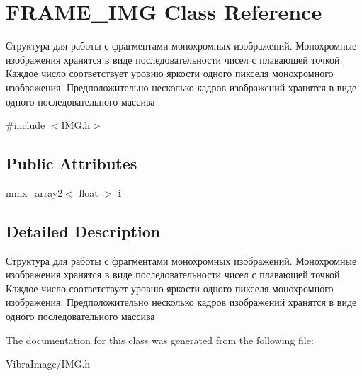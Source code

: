 \hypertarget{class_f_r_a_m_e___i_m_g}{\section{F\+R\+A\+M\+E\+\_\+\+I\+M\+G Class Reference}
\label{class_f_r_a_m_e___i_m_g}
}


Структура для работы с фрагментами монохромных изображений. Монохромные изображения хранятся в виде последовательности чисел с плавающей точкой. Каждое число соответствует уровню яркости одного пикселя монохромного изображения. Предположительно несколько кадров изображений хранятся в виде одного последовательного массива  




{\ttfamily \#include $<$I\+M\+G.\+h$>$}

\subsection*{Public Attributes}
\begin{DoxyCompactItemize}
\item 
\hypertarget{class_f_r_a_m_e___i_m_g_a162861222fd1c92164b564709c0afb0e}{\hyperlink{classmmx__array2}{mmx\+\_\+array2}$<$ float $>$ {\bfseries i}}\label{class_f_r_a_m_e___i_m_g_a162861222fd1c92164b564709c0afb0e}

\end{DoxyCompactItemize}


\subsection{Detailed Description}
Структура для работы с фрагментами монохромных изображений. Монохромные изображения хранятся в виде последовательности чисел с плавающей точкой. Каждое число соответствует уровню яркости одного пикселя монохромного изображения. Предположительно несколько кадров изображений хранятся в виде одного последовательного массива 



The documentation for this class was generated from the following file\+:\begin{DoxyCompactItemize}
\item 
Vibra\+Image/I\+M\+G.\+h\end{DoxyCompactItemize}
